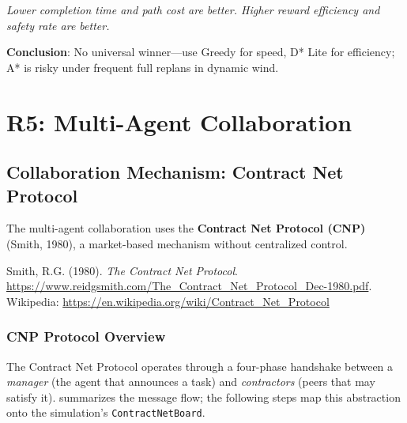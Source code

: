 \textit{Lower completion time and path cost are better. Higher reward efficiency and safety rate are better.}


\textbf{Conclusion}: No universal winner---use Greedy for speed, D* Lite for efficiency; A* is risky under frequent full replans in dynamic wind.

\section{R5: Multi-Agent Collaboration}

\subsection{Collaboration Mechanism: Contract Net Protocol}

The multi-agent collaboration uses the \textbf{Contract Net Protocol (CNP)} (Smith, 1980), a market-based mechanism without centralized control.

\begin{sustechnote}[title={References}]
Smith, R.G. (1980). \emph{The Contract Net Protocol}. \url{https://www.reidgsmith.com/The_Contract_Net_Protocol_Dec-1980.pdf}. Wikipedia: \url{https://en.wikipedia.org/wiki/Contract_Net_Protocol}
\end{sustechnote}

\subsubsection{CNP Protocol Overview}

The Contract Net Protocol operates through a four-phase handshake between a \emph{manager} (the agent that announces a task) and \emph{contractors} (peers that may satisfy it).  summarizes the message flow; the following steps map this abstraction onto the simulation's \texttt{ContractNetBoard}.

